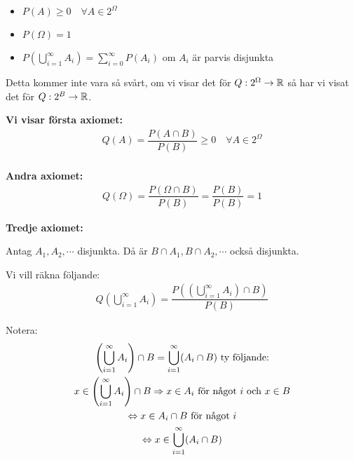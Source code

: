 \begin{itemize}
  \item $P(A)\geq0\quad \forall A\in2^{\Omega}$
  \item $P(\Omega) = 1$
  \item $P\left(\bigcup_{i=1}^{\infty}A_i\right) = \sum_{i=0}^{\infty}P(A_i)$ om $A_i$ är parvis disjunkta
\end{itemize}
\par\bigskip
\noindent Detta kommer inte vara så svårt, om vi visar det för $Q:2^\Omega\to\mathbb{R}$ så har vi visat det för $Q:2^B\to\mathbb{R}$.\par
\noindent\textbf{Vi visar första axiomet:} 
\begin{equation*}
  \begin{gathered}
    Q(A) = \dfrac{P(A\cap B)}{P(B)}\geq0\quad\forall A\in2^\Omega\\
  \end{gathered}
\end{equation*}
\par\bigskip
\noindent\textbf{Andra axiomet:} 
\begin{equation*}
  \begin{gathered}
  Q(\Omega) = \dfrac{P(\Omega\cap B)}{P(B)} = \dfrac{P(B)}{P(B)} = 1
  \end{gathered}
\end{equation*}
\par\bigskip
\noindent\textbf{Tredje axiomet:}\par
\noindent Antag $A_1, A_2,\cdots$ disjunkta. Då är $B\cap A_1, B\cap A_2,\cdots$ också disjunkta.\par
\noindent Vi vill räkna följande:
\begin{equation*}
  \begin{gathered}
    Q\left(\bigcup_{i=1}^{\infty}A_i\right) = \dfrac{P\left(\left(\bigcup_{i=1}^{\infty}A_i\right)\cap B\right)}{P(B)}
  \end{gathered}
\end{equation*}\par\bigskip
\noindent Notera:
\begin{equation*}
  \begin{gathered}
    \left(\bigcup_{i=1}^{\infty}A_i\right)\cap B = \bigcup_{i=1}^{\infty}(A_i\cap B)\text{ ty följande:}\\
    x\in \left(\bigcup_{i=1}^{\infty}A_i\right)\cap B\Rightarrow x\in A_i \text{ för något $i$ och $x\in B$}\\
    \Leftrightarrow x\in A_i\cap B\text{ för något $i$}\\
    \Leftrightarrow x\in \bigcup_{i=1}^{\infty}(A_i\cap B)
  \end{gathered}
\end{equation*}

